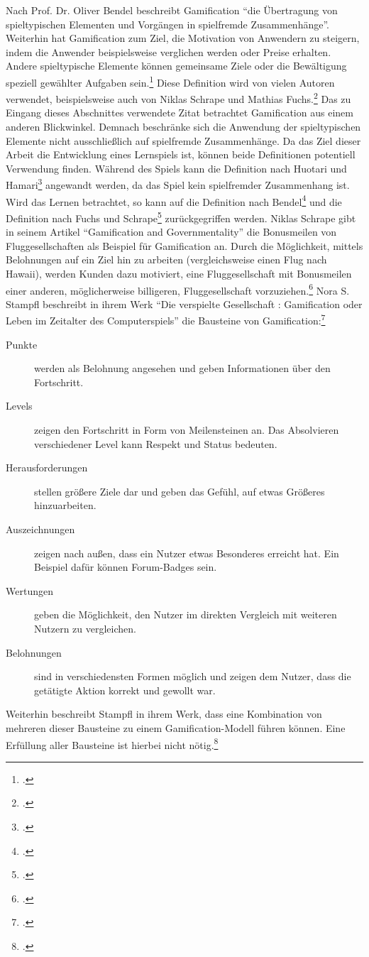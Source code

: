 	Nach Prof. Dr. Oliver Bendel beschreibt Gamification \enquote{die Übertragung von spieltypischen Elementen und Vorgängen in spielfremde Zusammenhänge}. Weiterhin hat Gamification zum Ziel, die Motivation von Anwendern zu steigern, indem die Anwender beispielsweise verglichen werden oder Preise erhalten. Andere spieltypische Elemente können gemeinsame Ziele oder die Bewältigung speziell gewählter Aufgaben sein.\footcite[\url{http://wirtschaftslexikon.gabler.de/Definition/gamification.html}]{gabler-gamification} Diese Definition wird von vielen Autoren verwendet, beispielsweise auch von Niklas Schrape und Mathias Fuchs.\footcite{gamification2}
	Das zu Eingang dieses Abschnittes verwendete Zitat betrachtet Gamification aus einem anderen Blickwinkel. Demnach beschränke sich die Anwendung der spieltypischen Elemente nicht ausschließlich auf spielfremde Zusammenhänge. Da das Ziel dieser Arbeit die Entwicklung eines Lernspiels ist, können beide Definitionen potentiell Verwendung finden. Während des Spiels kann die Definition nach Huotari und Hamari\footcite{gamification} angewandt werden, da das Spiel kein spielfremder Zusammenhang ist. Wird das Lernen betrachtet, so kann auf die Definition nach Bendel\footcite{gabler-gamification} und die Definition nach Fuchs und Schrape\footcite{gamification2} zurückgegriffen werden.
    Niklas Schrape gibt in seinem Artikel \enquote{Gamification and Governmentality} die Bonusmeilen von Fluggesellschaften als Beispiel für Gamification an. Durch die Möglichkeit, mittels Belohnungen auf ein Ziel hin zu arbeiten (vergleichsweise einen Flug nach Hawaii), werden Kunden dazu motiviert, eine Fluggesellschaft mit Bonusmeilen einer anderen, möglicherweise billigeren, Fluggesellschaft vorzuziehen.\footcite[S.26ff]{gamification2}
    Nora S. Stampfl beschreibt in ihrem Werk \enquote{Die verspielte Gesellschaft : Gamification oder Leben im Zeitalter des Computerspiels} die Bausteine von Gamification:\footcite{stampfl2012verspielte}
    \begin{description}
    	\item[Punkte]{werden als Belohnung angesehen und geben Informationen über den Fortschritt.}
    	\item[Levels]{zeigen den Fortschritt in Form von Meilensteinen an. Das Absolvieren verschiedener Level kann Respekt und Status bedeuten.}
    	\item[Herausforderungen]{stellen größere Ziele dar und geben das Gefühl, auf etwas Größeres hinzuarbeiten.}
    	\item[Auszeichnungen]{zeigen nach außen, dass ein Nutzer etwas Besonderes erreicht hat. Ein Beispiel dafür können Forum-Badges sein.}
    	\item[Wertungen]{geben die Möglichkeit, den Nutzer im direkten Vergleich mit weiteren Nutzern zu vergleichen.}
    	\item[Belohnungen]{sind in verschiedensten Formen möglich und zeigen dem Nutzer, dass die getätigte Aktion korrekt und gewollt war.}
    \end{description}
    Weiterhin beschreibt Stampfl in ihrem Werk, dass eine Kombination von mehreren dieser Bausteine zu einem Gamification-Modell führen können. Eine Erfüllung aller Bausteine ist hierbei nicht nötig.\footcite{stampfl2012verspielte}


